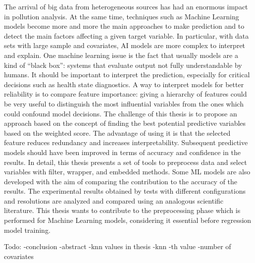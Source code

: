 The arrival of big data from heterogeneous sources has had an enormous impact in pollution analysis.
At the same time, techniques such as Machine Learning models become more and more the main approaches to make prediction and to detect the main factors affecting a given target variable.
In particular, with data sets with large sample and covariates, AI models are more complex to interpret and explain.
One machine learning issue is the fact that usually models are a kind of “black box”: systems that evaluate output not fully understandable by humans. 
It should be important to interpret the prediction, especially for critical decisions such as health state diagnostics.
A way to interpret models for better reliability is to compare feature importance: giving a hierarchy of features could be very useful to distinguish the most influential variables from the ones which could confound model decisions.
The challenge of this thesis is to propose an approach based on the concept of finding the best potential predictive variables based on the weighted score.
The advantage of using it is that the selected feature reduces redundancy and increases interpretability. 
Subsequent predictive models should have been improved in terms of accuracy and confidence in the results.
In detail, this thesis presents a set of tools to preprocess data and select variables with filter, wrapper, and embedded methods.
Some ML models are also developed with the aim of comparing the contribution to the accuracy of the results.
The experimental results obtained by tests with different configurations and resolutions are analyzed and compared using an analogous scientific literature.
This thesis wants to contribute to the preprocessing phase which is performed for Machine Learning models, considering it essential before regression model training.

Todo:
-conclusion 
-abstract
-knn values in thesis
-knn
-th value
-number of covariates
